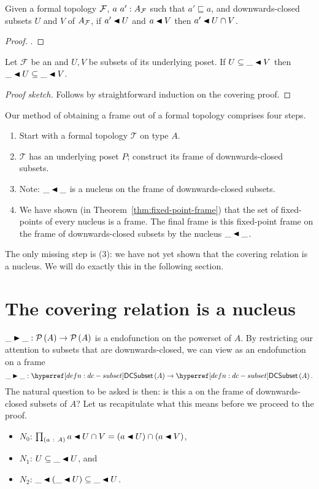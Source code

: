 \begin{prop}\label{prop:lem3}
  Given a formal topology $\mathcal{F}{}$, $a~a':A_{\mathcal{F}{}}$ such that $a' \sqsubseteq a$, and
  downwards-closed subsets $U$ and $V$ of $A_{\mathcal{F}{}}$, if $\covers{a'}{U}$ and
  $\covers{a}{V}$ then $\covers{a'}{U \cap V}$.
\end{prop}
\begin{proof}
  .
\end{proof}

\begin{prop}\label{prop:lem4}
  Let $\mathcal{F}$ be an \verintrsys{} and $U, V$ be subsets of its underlying poset. If
  $U \subseteq \covers{\_}{V}$ then $\covers{\_}{U} \subseteq \covers{\_}{V}$.
\end{prop}
\begin{proof}[Proof sketch]
  Follows by straightforward induction on the covering proof.
\end{proof}

Our method of obtaining a frame out of a formal topology comprises four steps.
\begin{enumerate}
  \item Start with a formal topology $\mathcal{T}$ on type $A$.
  \item $\mathcal{T}$ has an underlying poset $P$; construct its frame of downwards-closed
    subsets.
  \item Note: $\covers{\_}{\_}$ is a nucleus on the frame of downwards-closed subsets.
  \item We have shown (in Theorem~\ref{thm:fixed-point-frame}) that the set of
    fixed-points of every nucleus is a frame. The final frame is this fixed-point frame
    on the frame of downwards-closed subsets by the nucleus $\covers{\_}{\_}$.
\end{enumerate}
The only missing step is (3): we have not yet shown that the covering relation is a
nucleus. We will do exactly this in the following section.

\section{The covering relation is a nucleus}

$\_\RHD\_ : \pow{A} \rightarrow \pow{A}$ is a endofunction on the powerset of $A$. By restricting
our attention to subsets that are downwards-closed, we can view as an endofunction on a
frame
\begin{equation*}
  \oftyI{\_\RHD\_}{\dcsubset{A} \rightarrow \dcsubset{A}}.
\end{equation*}
The natural question to be asked is then: is this a \vernucleus{} on the frame of
downwards-closed subsets of $A$? Let us recapitulate what this means before we proceed
to the proof.
\begin{itemize}
  \item $N_0$: $\pity{a}{A}{\covers{a}{U \cap V} = (\covers{a}{U}) \cap (\covers{a}{V})}$,
  \item $N_1$: $U \subseteq \_ \covernm{} U$, and
  \item $N_2$: $\_ \covernm{} (\_ \covernm{} U) \subseteq \_ \covernm{} U$.
\end{itemize}

